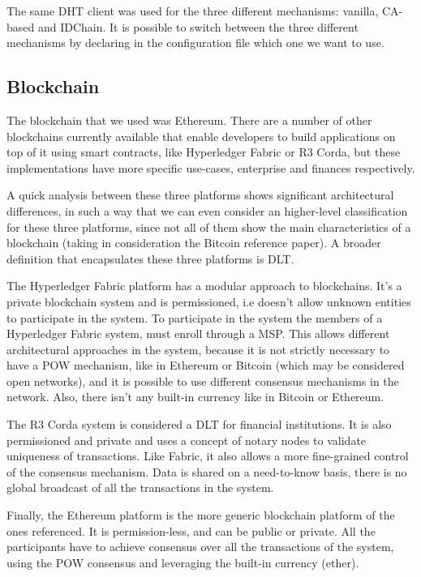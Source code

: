 The same DHT client was used for the three different mechanisms: vanilla, CA-based and IDChain.
It is possible to switch between the three different mechanisms by declaring in the configuration file which one we want to use.

\subsection{Blockchain}

The blockchain that we used was Ethereum.
There are a number of other blockchains currently available that enable developers to build applications on top of it using smart contracts, like Hyperledger Fabric\cite{cachin2016architecture} or R3 Corda\cite{mikehearn2016}, but these implementations have more specific use-cases, enterprise and finances respectively.

A quick analysis between these three platforms shows significant architectural differences, in such a way that we can even consider an higher-level classification for these three platforms, since not all of them show the main characteristics of a blockchain (taking in consideration the Bitcoin reference paper).
A broader definition that encapsulates these three platforms is \ac{DLT}.

The Hyperledger Fabric platform has a modular approach to blockchains. It's a private blockchain system  and is permissioned, i.e doesn't allow unknown entities to participate in the system.
To participate in the system the members of a Hyperledger Fabric system, must enroll through a \ac{MSP}.
This allows different architectural approaches in the system, because it is not strictly necessary to have a \ac{POW} mechanism, like in Ethereum or Bitcoin (which may be considered open networks), and it is possible to use different consensus mechanisms in the network.
Also, there isn't any built-in currency like in Bitcoin or Ethereum.

The R3 Corda system is considered a \ac{DLT} for financial institutions.
It is also permissioned and private and uses a concept of notary nodes to validate uniqueness of transactions. Like Fabric, it also allows a more fine-grained control of the consensus mechanism.
Data is shared on a need-to-know basis, there is no global broadcast of all the transactions in the system.

Finally, the Ethereum platform is the more generic blockchain platform of the ones referenced.
It is permission-less, and can be public or private.
All the participants have to achieve consensus over all the transactions of the system, using the \ac{POW} consensus and leveraging the built-in currency (ether).

